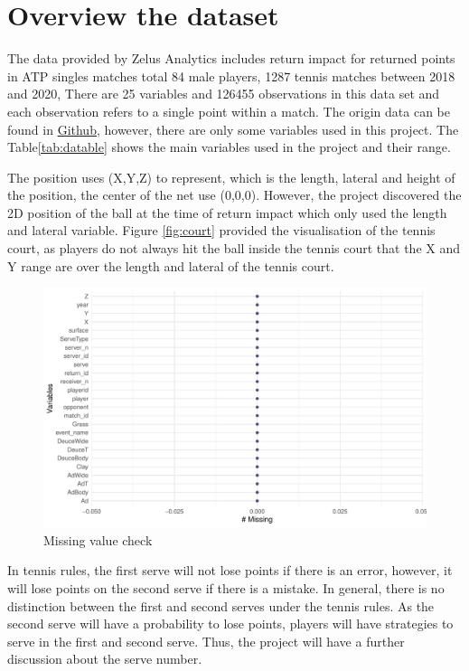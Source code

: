 \documentclass[11pt,a4paper,]{article}
\begin{document}
\hypertarget{overview-the-dataset}{%
\section{Overview the dataset}\label{overview-the-dataset}}

The data provided by Zelus Analytics includes return impact for returned points in ATP singles matches total 84 male players, 1287 tennis matches between 2018 and 2020, There are 25 variables and 126455 observations in this data set and each observation refers to a single point within a match. The origin data can be found in \href{https://github.com/skoval/monash-return-impact}{Github}, however, there are only some variables used in this project. The Table\ref{tab:datable} shows the main variables used in the project and their range.

The position uses (X,Y,Z) to represent, which is the length, lateral and height of the position, the center of the net use (0,0,0). However, the project discovered the 2D position of the ball at the time of return impact which only used the length and lateral variable. Figure \ref{fig:court} provided the visualisation of the tennis court, as players do not always hit the ball inside the tennis court that the X and Y range are over the length and lateral of the tennis court.

\begin{figure}

{\centering \includegraphics{pdf_files/figure-latex/tidymiss-1} 

}

\caption{Missing value check}\label{fig:tidymiss}
\end{figure}

In tennis rules, the first serve will not lose points if there is an error, however, it will lose points on the second serve if there is a mistake\autocite{usta}. In general, there is no distinction between the first and second serves under the tennis rules. As the second serve will have a probability to lose points, players will have strategies to serve in the first and second serve. Thus, the project will have a further discussion about the serve number.
\end{document}
